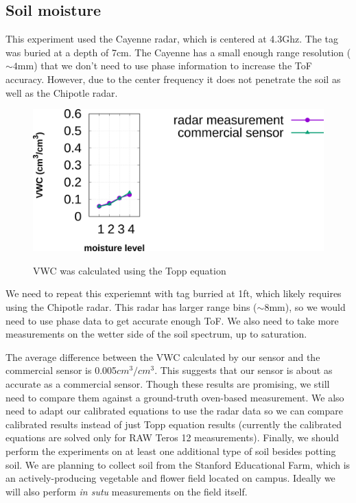\documentclass[12pt]{article}
\begin{document}
\subsection*{Soil moisture}

This experiment used the Cayenne radar, which is centered at 4.3Ghz.
The tag was buried at a depth of 7cm. The Cayenne has a small enough
range resolution ($\sim 4$mm) that we don't need to use phase
information to increase the ToF accuracy. However, due to the center
frequency it does not penetrate the soil as well as the Chipotle
radar. 

\begin{figure}[h!]
  \centering
  \includegraphics[scale=0.75]{../graphs/vwc.png}\\
  \caption{VWC was calculated using the Topp equation}
  \label{figure:moisture}
\end{figure}

We need to repeat this experiemnt with tag burried at 1ft,
which likely requires using the Chipotle radar. This radar has larger
range bins ($\sim 8$mm), so we would need to use phase data to get
accurate enough ToF. We also need to take more measurements on the
wetter side of the soil spectrum, up to saturation.

The average difference between the VWC calculated by our sensor and
the commercial sensor is 0.005$cm^3/cm^3$. This suggests that our
sensor is about as accurate as a commercial sensor. Though these
results are promising, we still need to compare them against a
ground-truth oven-based measurement. We also need to adapt our
calibrated equations to use the radar data so we can compare
calibrated results instead of just Topp equation results (currently
the calibrated equations are solved only for RAW Teros 12
measurements). Finally, we should perform the experiments on at least
one additional type of soil besides potting soil. We are planning to
collect soil from the Stanford Educational Farm, which is an
actively-producing vegetable and flower field located on
campus. Ideally we will also perform \emph{in sutu} measurements on
the field itself.
\end{document}
